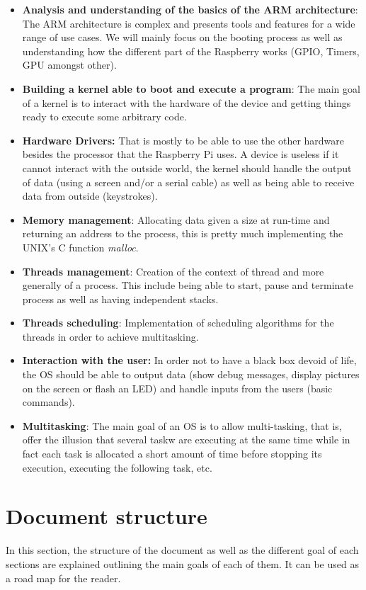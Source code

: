 \begin{itemize}
\item \textbf{Analysis and understanding of the basics of the ARM architecture}: The ARM architecture is complex and presents tools and features for a wide range of use cases. We will mainly focus on the booting process as well as understanding how the different part of the Raspberry works (GPIO, Timers, GPU amongst other).
\item \textbf{Building a kernel able to boot and execute a program}: The main goal of a kernel is to interact with the hardware of the device and getting things ready to execute some arbitrary code.
\item \textbf{Hardware Drivers:} That is mostly to be able to use the other hardware besides the processor that the Raspberry Pi uses. A device is useless if it cannot interact with the outside world, the kernel should handle the output of data (using a screen and/or a serial cable) as well as being able to receive data from outside (keystrokes).
\item \textbf{Memory management}: Allocating data given a size at run-time and returning an address to the process, this is pretty much implementing the UNIX's C function \textit{malloc}.
\item \textbf{Threads management}: Creation of the context of thread and more generally of a process. This include being able to start, pause and terminate process as well as having independent stacks.
\item \textbf{Threads scheduling}: Implementation of scheduling algorithms for the threads in order to achieve multitasking.
\item \textbf{Interaction with the user:} In order not to have a black box devoid of life, the OS should be able to output data (show debug messages, display pictures on the screen or flash an LED) and handle inputs from the users (basic commands).
\item \textbf{Multitasking}: The main goal of an OS is to allow multi-tasking, that is, offer the illusion that several taskw are executing at the same time while in fact each task is allocated a short amount of time before stopping its execution, executing the following task, etc.
\end{itemize}


\section{Document structure}
In this section, the structure of the document as well as the different goal of each sections are explained outlining the main goals of each of them. It can be used as a road map for the reader.

